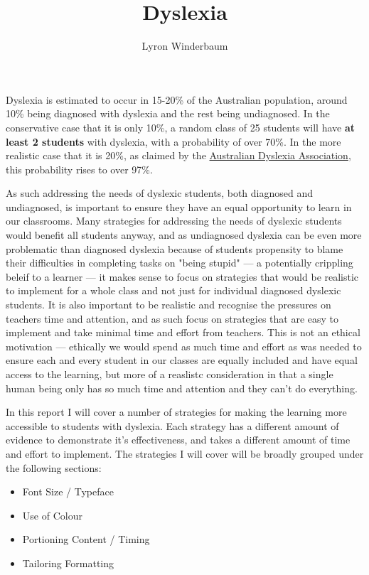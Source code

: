 \documentclass[12pt]{article}
\title{Dyslexia}
\author{Lyron Winderbaum}
\begin{document}
\maketitle



Dyslexia is estimated to occur in 15-20\% of the Australian population, around 10\% being diagnosed with dyslexia and the rest being undiagnosed. In the conservative case that it is only 10\%, a random class of 25 students will have \textbf{at least 2 students} with dyslexia, with a probability of over 70\%. In the more realistic case that it is 20\%, as claimed by the \href{https://dyslexiaassociation.org.au/dyslexia-in-australia/}{Australian Dyslexia Association}, this probability rises to over 97\%. 

As such addressing the needs of dyslexic students, both diagnosed and undiagnosed, is important to ensure they have an equal opportunity to learn in our classrooms. Many strategies for addressing the needs of dyslexic students would benefit all students anyway, and as undiagnosed dyslexia can be even more problematic than diagnosed dyslexia because of students propensity to blame their difficulties in completing tasks on "being stupid" --- a potentially crippling beleif to a learner --- it makes sense to focus on strategies that would be realistic to implement for a whole class and not just for individual diagnosed dyslexic students. It is also important to be realistic and recognise the pressures on teachers time and attention, and as such focus on strategies that are easy to implement and take minimal time and effort from teachers. This is not an ethical motivation --- ethically we would spend as much time and effort as was needed to ensure each and every student in our classes are equally included and have equal access to the learning, but more of a reaslistc consideration in that a single human being only has so much time and attention and they can't do everything.

In this report I will cover a number of strategies for making the learning more accessible to students with dyslexia. Each strategy has a different amount of evidence to demonstrate it's effectiveness, and takes a different amount of time and effort to implement. The strategies I will cover will be broadly grouped under the following sections:
\begin{itemize}
	\item Font Size / Typeface
	\item Use of Colour
	\item Portioning Content / Timing
	\item Tailoring Formatting
\end{itemize}
\end{document}
